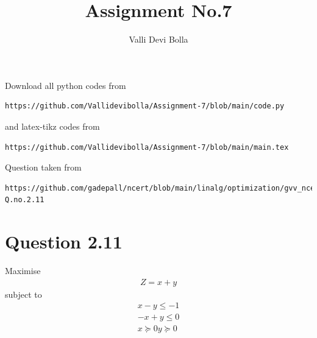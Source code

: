 \documentclass[journal,12pt,twocolumn]{IEEEtran}
\begin{document}
\def\rightbox#1{\makebox[0in][r]{#1}}
\def\centbox#1{\makebox[0in]{#1}}
\def\topbox#1{\raisebox{-\baselineskip}[0in][0in]{#1}}
\def\midbox#1{\raisebox{-0.5\baselineskip}[0in][0in]{#1}}
\vspace{3cm}
\title{Assignment No.7}
\author{Valli Devi Bolla}
\maketitle
\newpage
\bigskip
\renewcommand{\thefigure}{\theenumi}
\renewcommand{\thetable}{\theenumi}
Download all python codes from
\begin{lstlisting}
https://github.com/Vallidevibolla/Assignment-7/blob/main/code.py
\end{lstlisting}
%
and latex-tikz codes from
%
\begin{lstlisting}
https://github.com/Vallidevibolla/Assignment-7/blob/main/main.tex
\end{lstlisting}
%
Question taken from
\begin{lstlisting}
https://github.com/gadepall/ncert/blob/main/linalg/optimization/gvv_ncert_opt.pdf-Q.no.2.11
\end{lstlisting}
%
%
\section{Question 2.11}
Maximise
\begin{align}
Z = x + y  
\end{align}
subject to
\begin{align}
x-y \leq -1 \\
-x+y \leq 0 \\
x \succeq 0
y \succeq 0
\end{align}
\end{document}
